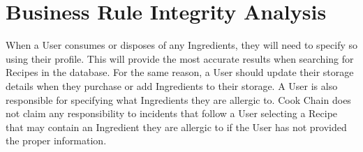 \documentclass{article}
\begin{document}
\section{Business Rule Integrity Analysis}
	When a User consumes or disposes of any Ingredients, they will need to specify so using their profile. This will provide the most accurate results when searching for Recipes in the database. For the same reason, a User should update their storage details when they purchase or add Ingredients to their storage. A User is also responsible for specifying what Ingredients they are allergic to. Cook Chain does not claim any responsibility to incidents that follow a User selecting a Recipe that may contain an Ingredient they are allergic to if the User has not provided the proper information.
\newpage
{}
 
\begin{thebibliography}{9}
\iffalse
\bibitem{latexcompanion} 
Michel Goossens, Frank Mittelbach, and Alexander Samarin. 
\textit{The \LaTeX\ Companion}. 
Addison-Wesley, Reading, Massachusetts, 1993.
 
\bibitem{einstein} 
Albert Einstein. 
\textit{Zur Elektrodynamik bewegter K{\"o}rper}. (German) 
[\textit{On the electrodynamics of moving bodies}]. 
Annalen der Physik, 322(10):891–921, 1905.
 
\bibitem{knuthwebsite} 
Knuth: Computers and Typesetting,
\\\texttt{http://www-cs-faculty.stanford.edu/\~{}uno/abcde.html}
\fi
\end{thebibliography}
 

 
\end{document}
